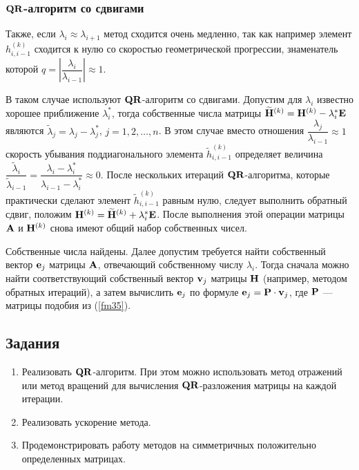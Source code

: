 \documentclass[12pt]{article}
\begin{document}
	\subsubsection*{$\bold{QR}$-алгоритм со сдвигами}
	
	Также, если $\lambda_{i}\approx\lambda_{i+1}$ метод сходится очень медленно, так как например элемент $h_{i,i-1}^{\left(k\right)}$ сходится к нулю со скоростью геометрической прогрессии, знаменатель которой $q=\left|\dfrac{\lambda_i}{\lambda_{i-1}}\right|\approx 1$.
	
	В таком случае используют $\bold{QR}$-алгоритм со сдвигами. Допустим для $\lambda_i$ известно хорошее приближение $\lambda_i^{*}$, тогда собственные числа матрицы $\widetilde{\bold{H}}^{\left(k\right)}=\bold{H}^{\left(k\right)}-\lambda_i^{*}\bold{E}$ являются $\widetilde{\lambda}_j=\lambda_j-\lambda_j^{*}$, $j=1,2,\ldots,n$. В этом случае вместо отношения $\dfrac{\lambda_j}{\lambda_{i-1}}\approx 1$ скорость убывания поддиагонального элемента $\widetilde{h}^{\left(k\right)}_{i,i-1}$ определяет величина $\dfrac{\widetilde{\lambda}_i}{\widetilde{\lambda}_{i-1}}=\dfrac{\lambda_i - \lambda_{i}^{*}}{\lambda_{i-1}-\lambda_i^{*}}\approx 0$. После нескольких итераций $\bold{QR}$-алгоритма, которые практически сделают элемент $\widetilde{h}^{\left(k\right)}_{i,i-1}$ равным нулю, следует выполнить обратный сдвиг, положим $\bold{H}^{\left(k\right)}=\widetilde{\bold{H}}^{\left(k\right)}+\lambda_i^{*}\bold{E}$. После выполнения этой операции матрицы $\bold{A}$ и $\bold{H}^{\left(k\right)}$ снова имеют общий набор собственных чисел.
	
	Собственные числа найдены. Далее допустим требуется найти собственный вектор $\bold{e}_j$ матрицы $\bold{A}$, отвечающий собственному числу $\lambda_i$. Тогда сначала можно найти соответствующий собственный вектор $\bold{v}_j$ матрицы $\bold{H}$ (например, методом обратных итераций), а затем вычислить $\bold{e}_j$ по формуле $\bold{e}_j=\bold{P}\cdot\bold{v}_j$, где $\bold{P}$ --- матрицы подобия из (\ref{fm35}).
	
	\subsection*{Задания}
	
	\begin{enumerate}
		\item Реализовать $\bold{QR}$-алгоритм. При этом можно использовать метод отражений или метод вращений для вычисления $\bold{QR}$-разложения матрицы на каждой итерации.
		\item Реализовать ускорение метода.
		\item Продемонстрировать работу методов на симметричных положительно определенных матрицах.
	\end{enumerate}
\end{document}
